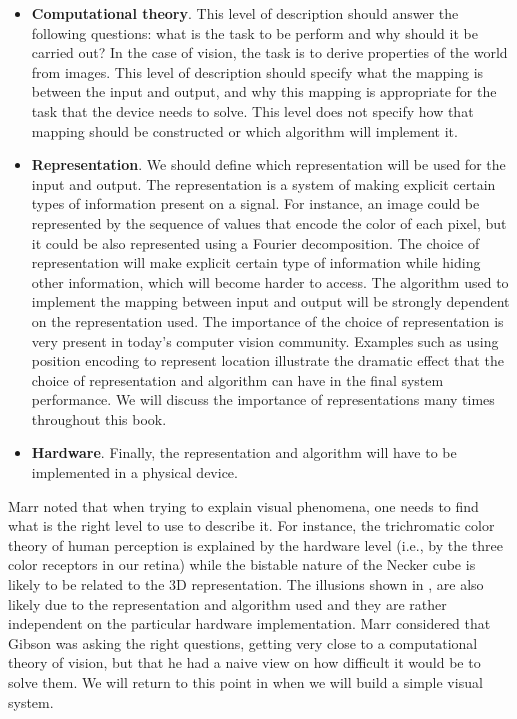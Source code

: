 \begin{itemize}
    \item {\bf Computational theory}. This level of description should answer the following questions: what is the task to be perform and why should it be carried out? In the case of vision, the task is to derive properties of the world from images. This level of description should specify what the mapping is between the input and output, and why this mapping is appropriate for the task that the device needs to solve. This level does not specify how that mapping should be constructed or which algorithm will implement it.
    \item {\bf Representation}. We should define which representation will be used for the input and output. The representation is a system of making explicit certain types of information present on a signal. For instance, an image could be represented by the sequence of values that encode the color of each pixel, but it could be also represented using a Fourier decomposition. The choice of representation will make explicit certain type of information while hiding other information, which will become harder to access. The algorithm used to implement the mapping between input and output will be strongly dependent on the representation used. The importance of the choice of representation is very present in today’s computer vision community. Examples such as using position encoding to represent location illustrate the dramatic effect that the choice of representation and algorithm can have in the final system performance. We will discuss the importance of representations many times throughout this book.
    \item {\bf Hardware}. Finally, the representation and algorithm will have to be implemented in a physical device.
\end{itemize}

Marr noted that when trying to explain visual phenomena, one needs to find what is the right level to use to describe it. For instance, the trichromatic color theory of human perception is explained by the hardware level (i.e., by the three color receptors in our retina) while the bistable nature of the Necker cube is likely to be related to the 3D representation. The illusions shown in \fig{\ref{fig:measuringScene}}, are also likely due to the representation and algorithm used and they are rather independent on the particular hardware implementation. Marr considered that Gibson was asking the right questions, getting very close to a computational theory of vision, but that he had a naive view on how difficult it would be to solve them. We will return to this point in \chap{\ref{chapter:simplesystem}} when we will build a simple visual system.


